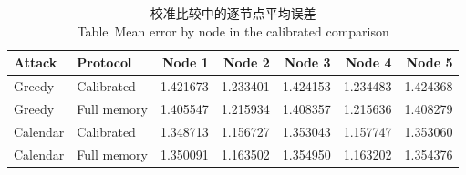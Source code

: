 \begin{table}[htbp]\centering\small
\caption{校准比较中的逐节点平均误差\\ Table~\thetable\quad Mean error by node in the calibrated comparison}
\begin{tabular}{llrrrrr}\toprule Attack & Protocol & Node 1 & Node 2 & Node 3 & Node 4 & Node 5\\\midrule
Greedy & Calibrated & 1.421673 & 1.233401 & 1.424153 & 1.234483 & 1.424368\\
Greedy & Full memory & 1.405547 & 1.215934 & 1.408357 & 1.215636 & 1.408279\\
Calendar & Calibrated & 1.348713 & 1.156727 & 1.353043 & 1.157747 & 1.353060\\
Calendar & Full memory & 1.350091 & 1.163502 & 1.354950 & 1.163202 & 1.354376\\
\bottomrule\end{tabular}
\end{table}